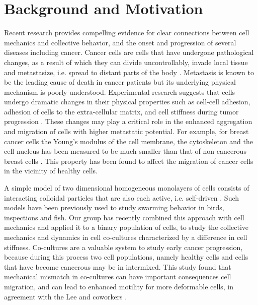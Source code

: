 \documentclass[aps,prb,twocolumn,groupedaddress,nofootinbib,floatfix]{revtex4}
\begin{document}
\maketitle

\section*{Background and Motivation}

Recent research provides compelling evidence for clear connections between cell mechanics and collective behavior, and the onset and progression
of several diseases including cancer. Cancer cells are cells that have undergone pathological changes, as a result of which they can divide uncontrollably, 
invade local tissue and metastasize, i.e. spread to distant parts of the body \cite{Suresh}. Metastasis is known to be the leading cause of death in cancer patients but 
its underlying physical mechanism is poorly understood. Experimental research suggests that cells  undergo dramatic changes in their physical properties such 
as cell-cell adhesion, adhesion of cells to the extra-cellular matrix, and cell stiffness during tumor progression \cite{Suresh}.
These changes may play a critical role in the enhanced aggregation and migration of cells with higher metastatic potential.
For example, for breast cancer cells the Young's modulus of the cell membrane, the cytoskeleton and the cell nucleus has 
been measured to be much smaller than that of non-cancerous breast cells \cite{Lee}.
This property has been found to affect the migration of cancer cells in the vicinity of healthy cells\cite{Lee}. 

A simple model of two dimensional homogeneous monolayers of cells  consists of interacting colloidal particles that are also each active, i.e. self-driven \cite{FilyMarchetti,RednerBaskaran}. 
Such models have been previously used to study swarming  behavior \cite{Vicsek} in birds, inspections and fish.
Our group has recently combined this approach with cell mechanics and applied it to a binary population of cells, to study the collective mechanics and dynamics in cell co-cultures characterized by a difference in cell stiffness.
Co-cultures are a valuable system to study early cancer progression, because during this process two cell populations, namely healthy cells and cells that have become cancerous may be in intermixed.   
This study found that mechanical mismatch in co-cultures can have important consequences cell migration, and can lead to enhanced motility for more deformable cells\cite{Butcher}, in agreement with
the Lee and coworkers \cite{Lee}. 
\end{document}
